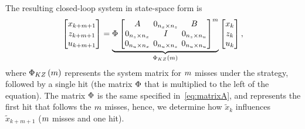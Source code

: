 The resulting closed-loop system in state-space form is
%
\begin{equation} 
    \setlength\arraycolsep{2pt}
    \label{eq:KZ}
    \begin{bmatrix}
        x_{k+\nummisses+1} \\
        z_{k+\nummisses+1} \\
        u_{k+\nummisses+1}
    \end{bmatrix} = 
    \underbrace{ \clmat{} \begin{bmatrix}
        \Ap                                         & 0_{n_x \times n_z}  & \Bp \\
        0_{n_z \times n_x}    & I                                         & 0_{n_z \times n_u} \\
        0_{n_u \times n_x}   & 0_{n_u \times n_z}   & 0_{n_u \times n_u}
    \end{bmatrix}^{\nummisses}}_{\clmat{}_{KZ}\funof{\nummisses}}
    \begin{bmatrix}
        x_{k} \\
        z_{k} \\
        u_{k}
    \end{bmatrix},
\end{equation}
%
where $\Phi{}_{KZ}\left( m \right)$ represents the system matrix for $m$ misses under the \tKZ{} strategy, followed by a single hit (the matrix $\Phi{}$ that is multiplied to the left of the equation).
The matrix $\Phi{}$ is the same specified in~\eqref{eq:matrixA}, and represents the first hit that follows the $m$ misses, hence, we determine how $\tilde{x}_k$ influences $\tilde{x}_{k+m+1}$ ($m$ misses and one hit).

